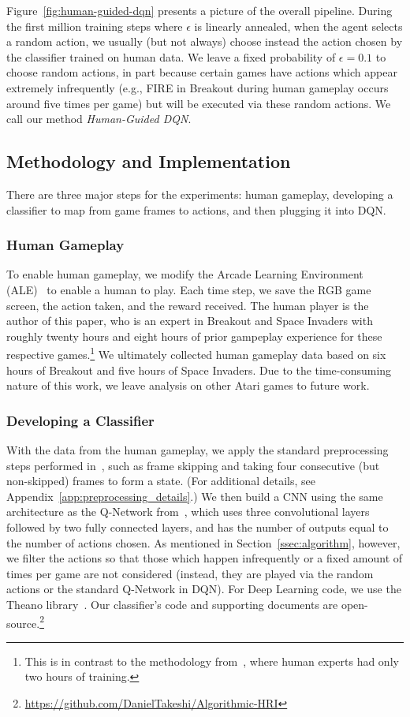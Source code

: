 \documentclass[letterpaper, 10pt, conference]{ieeeconf}
\begin{document}
Figure~\ref{fig:human-guided-dqn} presents a picture of the overall pipeline.
During the first million training steps where $\epsilon$ is linearly annealed,
when the agent selects a random action, we usually (but not always) choose
instead the action chosen by the classifier trained on human data. We leave a
fixed probability of $\epsilon=0.1$ to choose random actions, in part because
certain games have actions which appear extremely infrequently (e.g., FIRE in
Breakout during human gameplay occurs around five times per game) but will be
executed via these random actions. We call our method \emph{Human-Guided DQN}.

\subsection{Methodology and Implementation}\label{ssec:implementation}

There are three major steps for the experiments: human gameplay, developing a
classifier to map from game frames to actions, and then plugging it into DQN. 

\subsubsection{Human Gameplay} To enable human gameplay, we modify the Arcade
Learning Environment (ALE)~\cite{bellemare13arcade} to enable a human to play.
Each time step, we save the RGB game screen, the action taken, and the reward
received. The human player is the author of this paper, who is an expert in
Breakout and Space Invaders with roughly twenty hours and eight hours of prior
gampeplay experience for these respective games.\footnote{This is in contrast to
the methodology from~\cite{mnih-dqn-2015}, where human experts had only two
hours of training.} We ultimately collected human gameplay data based on six
hours of Breakout and five hours of Space Invaders. Due to the time-consuming
nature of this work, we leave analysis on other Atari games to future work.

\subsubsection{Developing a Classifier} With the data from the human gameplay,
we apply the standard preprocessing steps performed in~\cite{mnih-dqn-2015},
such as frame skipping and taking four consecutive (but non-skipped) frames to
form a state. (For additional details, see
Appendix~\ref{app:preprocessing_details}.) We then build a CNN
using the same architecture as the Q-Network from~\cite{mnih-dqn-2015},
which uses three convolutional layers followed by two fully connected layers,
and has the number of outputs equal to the number of actions chosen. As
mentioned in Section~\ref{ssec:algorithm}, however, we filter the actions so
that those which happen infrequently or a fixed amount of times per game are not
considered (instead, they are played via the random actions or the standard
Q-Network in DQN). For Deep Learning code, we use the Theano
library~\cite{2016arXiv160502688short}.  Our classifier's code and supporting
documents are
open-source.\footnote{\url{https://github.com/DanielTakeshi/Algorithmic-HRI}}
\end{document}
